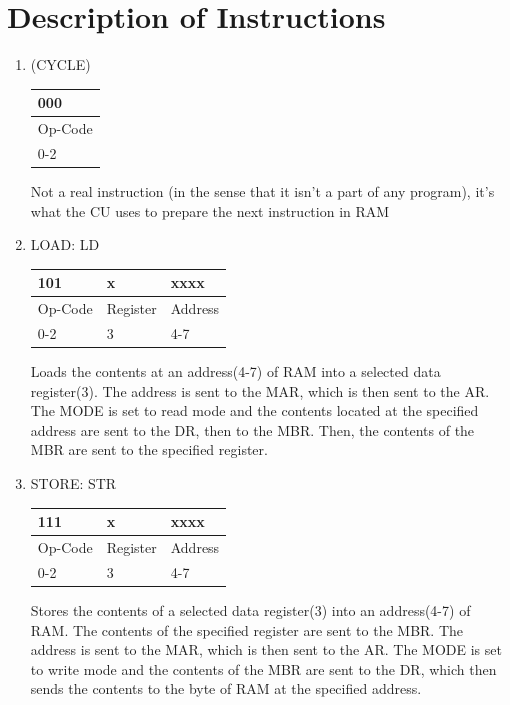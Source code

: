 \documentclass{article}
\begin{document}
	\section{Description of Instructions}
	\begin{enumerate}
\item (CYCLE)\\
\begin{tabularx}{\textwidth}{|X|}
	\hline 000
	\\ \hline Op-Code
	\\ \hline 0-2
	\\ \hline
\end{tabularx}
Not a real instruction (in the sense that it isn't a part of any program), it's what the CU uses to prepare the next instruction in RAM

\item LOAD: LD\\
  \begin{tabularx}{\textwidth}{|X|X|X|}
    \hline 101 & x & xxxx
    \\ \hline Op-Code & Register & Address
    \\ \hline 0-2 & 3 & 4-7
    \\ \hline
  \end{tabularx}
Loads the contents at an address(4-7) of RAM into a selected data register(3). The address is sent to the MAR, which is then sent to the AR. The MODE is set to read mode and the contents located at the specified address are sent to the DR, then to the MBR. Then, the contents of the MBR are sent to the specified register.

\item STORE: STR\\
  \begin{tabularx}{\textwidth}{|X|X|X|}
    \hline 111 & x & xxxx
    \\ \hline Op-Code & Register & Address
    \\ \hline 0-2 & 3 & 4-7
    \\ \hline
  \end{tabularx}
Stores the contents of a selected data register(3) into an address(4-7) of RAM. The contents of the specified register are sent to the MBR. The address is sent to the MAR, which is then sent to the AR. The MODE is set to write mode and the contents of the MBR are sent to the DR, which then sends the contents to the byte of RAM at the specified address.


\end{enumerate}
\end{document}
